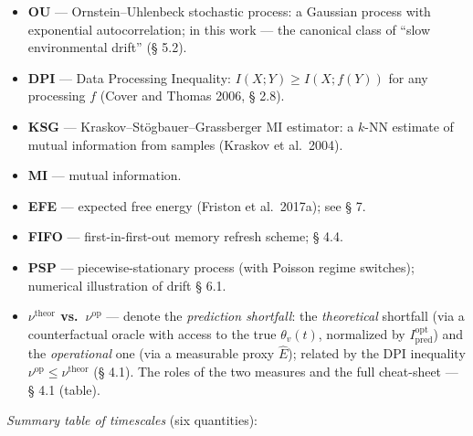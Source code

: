 \documentclass[pdflatex,sn-mathphys-ay]{sn-jnl}
\providecommand{\tightlist}{\setlength{\itemsep}{0pt}\setlength{\parskip}{0pt}}
\begin{document}
\begin{itemize}

\tightlist

\item

  \textbf{OU} --- Ornstein--Uhlenbeck stochastic process: a Gaussian process with exponential autocorrelation; in this work --- the canonical class of ``slow environmental drift'' (§ 5.2).

\item

  \textbf{DPI} --- Data Processing Inequality: \(I(X; Y) \ge I(X; f(Y))\) for any processing \(f\) (Cover and Thomas 2006, § 2.8).

\item

  \textbf{KSG} --- Kraskov--Stögbauer--Grassberger MI estimator: a \(k\)-NN estimate of mutual information from samples (Kraskov et al.~2004).

\item

  \textbf{MI} --- mutual information.

\item

  \textbf{EFE} --- expected free energy (Friston et al.~2017a); see § 7.

\item

  \textbf{FIFO} --- first-in-first-out memory refresh scheme; § 4.4.

\item

  \textbf{PSP} --- piecewise-stationary process (with Poisson regime switches); numerical illustration of drift § 6.1.

\item

  \textbf{\(\nu^{\text{theor}}\) vs.~\(\nu^{\text{op}}\)} --- denote the \emph{prediction shortfall}: the \emph{theoretical} shortfall (via a counterfactual oracle with access to the true \(\theta_v(t)\), normalized by \(I_{\text{pred}}^{\text{opt}}\)) and the \emph{operational} one (via a measurable proxy \(\hat E\)); related by the DPI inequality \(\nu^{\text{op}} \le \nu^{\text{theor}}\) (§ 4.1). The roles of the two measures and the full cheat-sheet --- § 4.1 (table).

\end{itemize}



\emph{Summary table of timescales} (six quantities):
\end{document}
